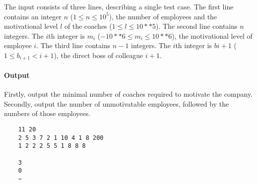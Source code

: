 The input consists of three lines, describing a single test case.
The first line contains an integer $n$ ($1 \leq n \leq 10^5$), the number of employees and the motivational level $l$ of the coaches ($1 \leq l \leq 10**5$).
The second line contains $n$ integers. The $i$th integer is $m_i$ ($-10**6 \leq m_i \leq 10**6$), the motivational level of employee $i$.
The third line contains $n - 1$ integers. The $i$th integer is $bi+1$ ($1 \leq b_{i+1} < i + 1$), the direct boss of colleague $i + 1$.

\paragraph*{Output}

Firstly, output the minimal number of coaches required to motivate the company. Secondly, output the number of 
unmotivatable employees, followed by the numbers of those employees.


\begin{samples}
  \begin{verbatim}
    11 20
    2 5 3 7 2 1 10 4 1 8 200
    1 2 2 2 5 5 1 8 8 8

    3
    0
    ~
  \end{verbatim}
\end{samples}


